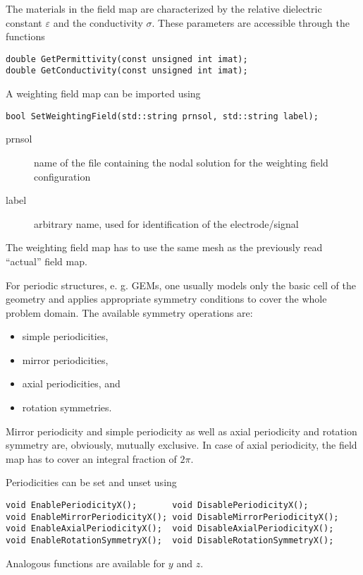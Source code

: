 The materials in the field map are characterized by the 
relative dielectric constant \(\varepsilon\) and the 
conductivity \(\sigma\). 
These parameters are accessible through the functions
\begin{lstlisting}
double GetPermittivity(const unsigned int imat);
double GetConductivity(const unsigned int imat);
\end{lstlisting}

A weighting field map can be imported using
\begin{lstlisting}
bool SetWeightingField(std::string prnsol, std::string label);
\end{lstlisting}
\begin{description}
  \item[prnsol]
  name of the file containing the nodal solution for the weighting field
  configuration
  \item[label]
  arbitrary name, used for identification of the electrode/signal
\end{description}

The weighting field map has to use the same mesh as the previously 
read ``actual'' field map.

For periodic structures, e. g. GEMs, one usually models only 
the basic cell of the geometry and applies appropriate symmetry 
conditions to cover the whole problem domain. 
The available symmetry operations are:
\begin{itemize}
  \item
  simple periodicities,
  \item
  mirror periodicities, 
  \item
  axial periodicities, and
  \item
  rotation symmetries.
\end{itemize}

Mirror periodicity and simple periodicity as well as 
axial periodicity and rotation symmetry are, 
obviously, mutually exclusive. 
In case of axial periodicity, the field map has to cover an 
integral fraction of \(2\pi\). 

Periodicities can be set and unset using
\begin{lstlisting}
void EnablePeriodicityX();       void DisablePeriodicityX();
void EnableMirrorPeriodicityX(); void DisableMirrorPeriodicityX();
void EnableAxialPeriodicityX();  void DisableAxialPeriodicityX();
void EnableRotationSymmetryX();  void DisableRotationSymmetryX();
\end{lstlisting}
Analogous functions are available for \(y\) and \(z\).

